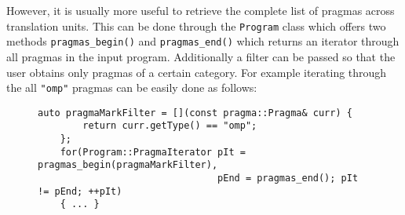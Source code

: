 \documentclass[10pt]{report}
\begin{document}
However, it is usually more useful to retrieve the complete list of pragmas
across translation units. This can be done through the {\tt Program}
class which offers two methods {\tt pragmas\_begin()} and {\tt pragmas\_end()}
which returns an iterator through all pragmas in the input program. Additionally
a filter can be passed so that the user obtains only pragmas of a certain
category. For example iterating through the all {\tt "omp"} pragmas
can be easily done as follows:

\begin{figure}[ht]
	\begin{lstlisting}[label=fig6,caption=Iterate through pragmas in multiple TUs]
	auto pragmaMarkFilter = [](const pragma::Pragma& curr) { 
		return curr.getType() == "omp"; 
	};
	for(Program::PragmaIterator pIt = pragmas_begin(pragmaMarkFilter), 
								pEnd = pragmas_end(); pIt != pEnd; ++pIt) 
	{ ... }
	\end{lstlisting}
\end{figure}
\end{document}
